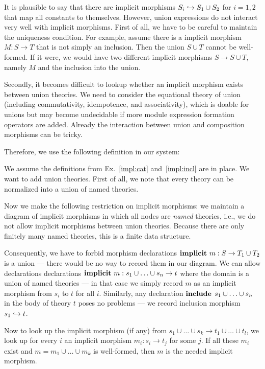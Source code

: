 \begin{union}
It is plausible to say that there are implicit morphisms $S_i\hookrightarrow S_1\cup S_2$ for $i=1,2$ that map all constants to themselves.
However, union expressions do not interact very well with implicit morphisms.
First of all, we have to be careful to maintain the uniqueness condition.
For example, assume there is a implicit morphism $M:S\to T$ that is not simply an inclusion.
Then the union $S\cup T$ cannot be well-formed.
If it were, we would have two different implicit morphisms $S\to S\cup T$, namely $M$ and the inclusion into the union.

Secondly, it becomes difficult to lookup whether an implicit morphism exists between union theories.
We need to consider the equational theory of union (including commutativity, idempotence, and associativity), which is doable for unions but may become undecidable if more module expression formation operators are added.
Already the interaction between union and composition morphisms can be tricky.

Therefore, we use the following definition in our system:

\begin{example}\label{impl:union}
We assume the definitions from Ex.~\ref{impl:cat} and~\ref{impl:incl} are in place.
We want to add union theories.
First of all, we note that every theory can be normalized into a union of named theories.

Now we make the following restriction on implicit morphisms: we maintain a diagram of implicit morphisms in which all nodes are \emph{named} theories, i.e., we do not allow implicit morphisms between union theories.
Because there are only finitely many named theories, this is a finite data structure.

Consequently, we have to forbid morphism declarations $\operatorname{\mathbf{implicit}}\,m:S\to T_1\cup T_2$ is a union --- there would be no way to record them in our diagram.
We can allow declarations declarations $\operatorname{\mathbf{implicit}}\,m:s_1\cup\ldots\cup s_n\to t$ where the domain is a union of named theories --- in that case we simply record $m$ as an implicit morphism from $s_i$ to $t$ for all $i$.
Similarly, any declaration $\operatorname{\mathbf{include}}{\;s_1\cup\ldots\cup s_n}$ in the body of theory $t$ poses no problems --- we record inclusion morphism $s_1\hookrightarrow t$.

Now to look up the implicit morphism (if any) from $s_1\cup\ldots\cup s_k\to t_1\cup\ldots\cup t_l$, we look up for every $i$ an implicit morphism $m_i:s_i\to t_j$ for some $j$.
If all these $m_i$ exist and $m=m_1\cup \ldots\cup m_k$ is well-formed, then $m$ is the needed implicit morphism.
\end{example}
\end{union}

